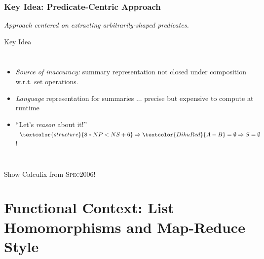 \documentclass{beamer}
\renewcommand{\emph}[1]{\textcolor{structure}{#1}}
\newcommand{\emp}[1]{\textcolor{DikuRed}{ #1}}
\begin{document}
\begin{frame}[fragile,t]
  \frametitle{Key Idea: Predicate-Centric Approach}

\smallskip

{\em Approach centered on extracting arbitrarily-shaped predicates.} 

\bigskip

\begin{block}{Key Idea} 
\begin{columns} 
 \vspace{-2ex}
\begin{itemize}
    \item \emp{{\em Source of inaccuracy:}} summary representation not closed under composition w.r.t. set operations. \bigskip
    \item \emph{{\em Language}} representation for summaries ... precise but \emp{expensive} to compute at runtime \bigskip
    \item ``Let's \emph{{\em reason}} about it!'' $\emph{8*NP < NS + 6} \Rightarrow \emp{A - B} = \emptyset \Rightarrow S=\emptyset$!
\end{itemize}
\hspace{-2ex}\includegraphics[height=30ex]{ParTeaserFigs/USR_HE_FIND_SOLVH}
\end{columns}
\end{block}

\alert{Show Calculix from \textsc{Spec2006}}!

\end{frame}



\section{Functional Context: List Homomorphisms and Map-Reduce Style}
\begin{frame}[fragile]
	\tableofcontents[currentsection]
\end{frame}
\end{document}
